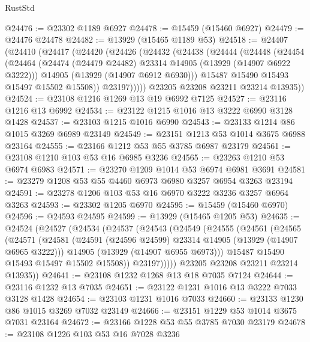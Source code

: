 \begin{lexlean}{RustStd}
\begin{coremodule}
@24476 := @23302 @1189 @6927
@24478 := @15459 (@15460 @6927)
@24479 := @24476 @24478
@24482 := @13929 (@15465 @1189 @53)
@24518 := @24407
    (@24410
      (@24417
        (@24420
          (@24426
            (@24432
              (@24438
                (@24444
                  (@24448
                    (@24454
                      (@24464
                        (@24474 (@24479 @24482) @23314 @14905 (@13929 (@14907 @6922 @3222)))
                        @14905
                        (@13929 (@14907 @6912 @6930)))
                      @15487
                      @15490
                      @15493
                      @15497
                      @15502
                      @15508))
                  @23197)))))
        @23205
        @23208
        @23211
        @23214
        @13935))
@24524 := @23108 @1216 @1269 @13 @19 @6992 @7125
@24527 := @23116 @1216 @13 @6992
@24534 := @23122 @1215 @1016 @13 @3222 @6990 @3128 @1428
@24537 := @23103 @1215 @1016 @6990
@24543 := @23133 @1214 @86 @1015 @3269 @6989 @23149
@24549 := @23151 @1213 @53 @1014 @3675 @6988 @23164
@24555 := @23166 @1212 @53 @55 @3785 @6987 @23179
@24561 := @23108 @1210 @103 @53 @16 @6985 @3236
@24565 := @23263 @1210 @53 @6974 @6983
@24571 := @23270 @1209 @1014 @53 @6974 @6981 @3691
@24581 := @23279 @1208 @53 @55 @4460 @6973 @6980 @3257 @6954 @3263 @23194
@24591 := @23278 @1206 @103 @53 @16 @6970 @3222 @3236 @3257 @6964 @3263
@24593 := @23302 @1205 @6970
@24595 := @15459 (@15460 @6970)
@24596 := @24593 @24595
@24599 := @13929 (@15465 @1205 @53)
@24635 := @24524
    (@24527
      (@24534
        (@24537
          (@24543
            (@24549
              (@24555
                (@24561
                  (@24565
                    (@24571
                      (@24581
                        (@24591 (@24596 @24599) @23314 @14905 (@13929 (@14907 @6965 @3222)))
                        @14905
                        (@13929 (@14907 @6955 @6973)))
                      @15487
                      @15490
                      @15493
                      @15497
                      @15502
                      @15508))
                  @23197)))))
        @23205
        @23208
        @23211
        @23214
        @13935))
@24641 := @23108 @1232 @1268 @13 @18 @7035 @7124
@24644 := @23116 @1232 @13 @7035
@24651 := @23122 @1231 @1016 @13 @3222 @7033 @3128 @1428
@24654 := @23103 @1231 @1016 @7033
@24660 := @23133 @1230 @86 @1015 @3269 @7032 @23149
@24666 := @23151 @1229 @53 @1014 @3675 @7031 @23164
@24672 := @23166 @1228 @53 @55 @3785 @7030 @23179
@24678 := @23108 @1226 @103 @53 @16 @7028 @3236

\end{coremodule}
\end{lexlean}
